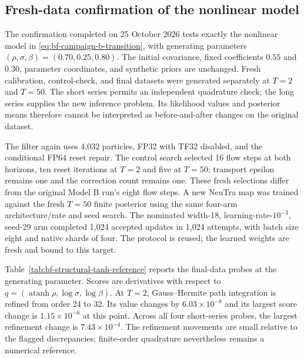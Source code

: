 \subsection{Fresh-data confirmation of the nonlinear model}
\label{sec:bf-structural-tanh-confirmation}

The confirmation completed on 25 October 2026 tests exactly the nonlinear
model in \eqref{eq:bf-campaign-b-transition}, with generating parameters
$(\rho,\sigma,\beta)=(0.70,0.25,0.80)$.  The initial covariance, fixed
coefficients $0.55$ and $0.30$, parameter coordinates, and synthetic priors
are unchanged.  Fresh calibration, control-check, and final datasets were
generated separately at $T=2$ and $T=50$.  The short series permits an
independent quadrature check; the long series supplies the new inference
problem.  Its likelihood values and posterior means therefore cannot be
interpreted as before-and-after changes on the original dataset.

The filter again uses 4,032 particles, FP32 with TF32 disabled, and the
conditional FP64 reset repair.  The control search selected 16 flow steps
at both horizons, ten reset iterations at $T=2$ and five at $T=50$;
transport epsilon remains one and the correction count remains one.
These fresh selections differ from the original Model B run's eight flow
steps.  A new NeuTra map was trained against the fresh $T=50$ finite
posterior using the same four-arm architecture/rate and seed search.
The nominated width-18, learning-rate-$10^{-3}$, seed-29 arm completed
1,024 accepted updates in 1,024 attempts, with batch size eight and native
shards of four.  The protocol is reused; the learned weights are fresh and
bound to this target.

Table~\ref{tab:bf-structural-tanh-reference} reports the final-data probes at
the generating parameter.  Scores are derivatives with respect to
$q=(\operatorname{atanh}\rho,\log\sigma,\log\beta)$.
At $T=2$, Gauss--Hermite path integration is refined from order 24 to 32.
Its value changes by $6.03\times10^{-8}$ and its largest score change is
$1.15\times10^{-6}$ at this point.  Across all four short-series probes,
the largest refinement change is $7.43\times10^{-4}$.  The refinement movements are small relative to the flagged discrepancies;
finite-order quadrature nevertheless remains a numerical reference.

